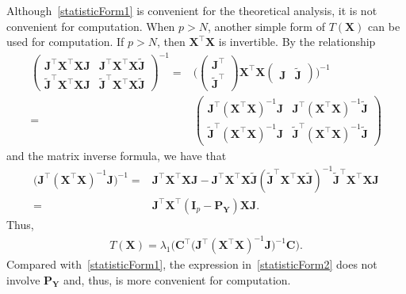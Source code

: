 \documentclass[12pt]{article} %
\newcommand{\bA}{\mathbf{A}}
\newcommand{\bX}{\mathbf{X}}
\newcommand{\bP}{\mathbf{P}}
\newcommand{\bY}{\mathbf{Y}}
\newcommand{\bJ}{\mathbf{J}}
\newcommand{\bC}{\mathbf{C}}
\newcommand{\bI}{\mathbf{I}}
\theoremstyle{definition}
\begin{document}
Although~\eqref{statisticForm1} is convenient for the theoretical analysis, it is not convenient for computation.
When $p>N$, another simple form of $T(\bX)$ can be used for computation.
If $p>N$, then $\bX^\top \bX$ is invertible.
By the relationship
\begin{equation*}
    \begin{aligned}
        \begin{pmatrix}
            \bJ^\top \bX^\top \bX\bJ & \bJ^\top \bX^\top \bX\tilde{\bJ}\\
            \tilde{\bJ}^\top \bX^\top \bX \bJ & \tilde{\bJ}^\top \bX^\top \bX \tilde{\bJ}
        \end{pmatrix}^{-1}
        =&
        \Big(
        \begin{pmatrix}
            \bJ^\top\\
            \tilde{\bJ}^\top
        \end{pmatrix}
        \bX^\top \bX
        \begin{pmatrix}
            \bJ &\tilde{\bJ}
        \end{pmatrix}
        \Big)^{-1}
        \\
        =&
        \begin{pmatrix}
            \bJ^\top {(\bX^\top \bX)}^{-1}\bJ & \bJ^\top {(\bX^\top \bX)}^{-1}\tilde{\bJ}\\
            \tilde{\bJ}^\top {(\bX^\top \bX)}^{-1}\bJ & \tilde{\bJ}^\top {(\bX^\top \bX)}^{-1} \tilde{\bJ}
        \end{pmatrix}
    \end{aligned}
\end{equation*}
and the matrix inverse formula, we have that
\begin{equation*}
    \begin{aligned}
        \big( \bJ^\top {(\bX^\top \bX)}^{-1}\bJ \big)^{-1}
        =&\bJ^\top \bX^\top \bX \bJ - \bJ^\top \bX^\top \bX\tilde{\bJ}{(\tilde{\bJ}^\top \bX^\top \bX \tilde{\bJ})}^{-1}
            \tilde{\bJ}^\top \bX^\top \bX\bJ 
            \\
        =& \bJ^\top \bX^\top( \bI_p- \bP_{\bY}) \bX \bJ.
    \end{aligned}
\end{equation*}
Thus, 
\begin{equation}\label{statisticForm2}
    \begin{aligned}
        T(\bX)=
        \lambda_1 \Big(\bC^\top\big( \bJ^\top (\bX^\top \bX)^{-1}\bJ \big)^{-1}\bC\Big).
    \end{aligned}
\end{equation}
Compared with~\eqref{statisticForm1}, the expression in~\eqref{statisticForm2} does not involve $\bP_{\bY}$ and, thus, is more convenient for computation.
\end{document}
